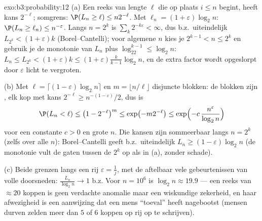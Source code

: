 \begin{solution}{exo:b3:probability:12}
(a) Een reeks van lengte $\ell$ die op plaats $i \leq n$ begint,
heeft kans $2^{-\ell}$; somgrens: $\P(L_n \geq \ell) \leq
n2^{-\ell}$. Met $\ell_n = (1 + \varepsilon)\log_2n$: $\P(L_n
\geq \ell_n) \leq n^{-\varepsilon}$. Langs $n = 2^k$ is
$\sum_k2^{-k\varepsilon} < \infty$, dus b.z.\ uiteindelijk
$L_{2^k} < (1+\varepsilon)k$ (Borel--Cantelli); voor algemene $n$
kies je $2^{k-1} < n \leq 2^k$ en gebruik je de monotonie van
$L_n$ plus $\log_22^{k-1} \leq \log_2n$: $L_n \leq L_{2^k} < (1 +
\varepsilon)k \leq (1 + \varepsilon)\frac{k}{k-1} \log_2n$, en de
extra factor wordt opgeslorpt door $\varepsilon$ licht te
vergroten.

(b) Met $\ell = \lceil(1 - \varepsilon)\log_2n\rceil$ en $m =
\lfloor n/\ell\rfloor$ disjuncte blokken: de blokken zijn
, elk  kop met kans $2^{-\ell} \geq
n^{-(1-\varepsilon)}/2$, dus is
\[
\P(L_n < \ell) \leq \bigl(1 - 2^{-\ell}\bigr)^{m}
\leq \exp\bigl(-m2^{-\ell}\bigr)
\leq \exp\Bigl(-c\,\frac{n^{\varepsilon}}{\log_2n}\Bigr)
\]
voor een constante $c > 0$ en grote $n$. Die kansen zijn
sommeerbaar langs $n = 2^k$ (zelfs over alle $n$):
Borel--Cantelli geeft b.z.\ uiteindelijk $L_n \geq (1 -
\varepsilon)\log_2n$ (de monotonie vult de gaten tussen de $2^k$
op als in (a), zonder schade).

(c) Beide grenzen langs een rij $\varepsilon = \frac1j$, met de
aftelbaar vele gebeurtenissen van volle  doorsneden:
$\frac{L_n}{\log_2n} \to 1$ b.z. Voor $n = 10^6$ is $\log_2n
\approx 19.9$ --- een reeks van $\approx 20$ koppen is geen
verdachte anomalie maar een wiskundige zekerheid, en haar
afwezigheid is een aanwijzing dat een mens ``toeval'' heeft
nagebootst (mensen durven zelden meer dan $5$ of $6$ koppen op
rij op te schrijven).
\end{solution}

